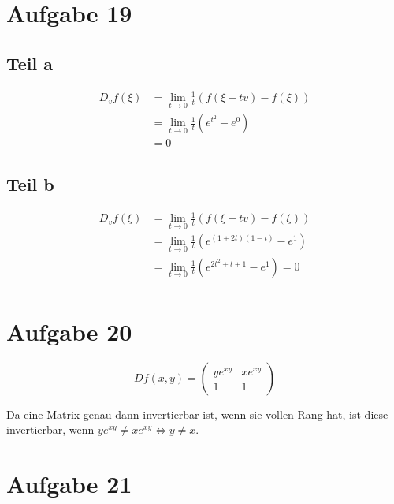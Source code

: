 \documentclass[10pt,a4paper]{article}
\begin{document}
\section*{Aufgabe 19}

\subsection*{Teil a}

\begin{align*}
D_{v}f(\xi) & = \lim_{t \rightarrow 0} \frac{1}{t} (f(\xi + tv) - f(\xi))\\
& = \lim_{t \rightarrow 0} \frac{1}{t} (e^{t^{2}} - e^{0})\\
& = 0
\end{align*}

\subsection*{Teil b}

\begin{align*}
D_{v}f(\xi) & = \lim_{t \rightarrow 0} \frac{1}{t} (f(\xi + tv) - f(\xi))\\
& = \lim_{t \rightarrow 0} \frac{1}{t} (e^{(1 + 2t)(1 - t)} - e^{1})\\
& = \lim_{t \rightarrow 0} \frac{1}{t} (e^{2t^{2} + t + 1} - e^{1}) = 0\\
\end{align*}

\section*{Aufgabe 20}

\begin{equation}
Df(x, y) =
\begin{pmatrix}
ye^{xy} & xe^{xy}\\
1 & 1
\end{pmatrix}
\end{equation}

Da eine Matrix genau dann invertierbar ist, wenn sie vollen Rang hat, ist diese invertierbar, wenn $ye^{xy} \ne xe^{xy} \Leftrightarrow y \ne x$.

\section*{Aufgabe 21}
\end{document}
